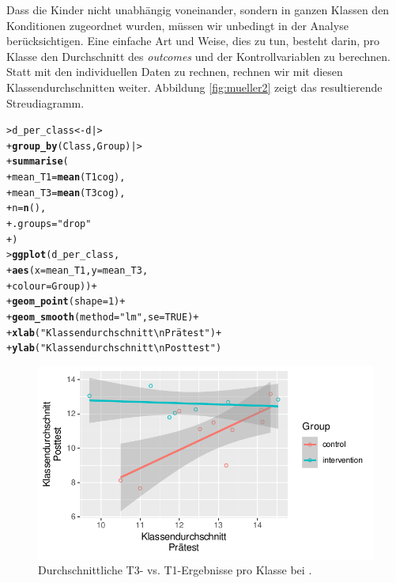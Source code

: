 \documentclass[oneside, 10pt]{book}\usepackage[]{graphicx}\usepackage[]{xcolor}
\makeatletter
\newcommand{\hlnum}[1]{\textcolor[rgb]{0.686,0.059,0.569}{#1}}%
\newcommand{\hlstr}[1]{\textcolor[rgb]{0.192,0.494,0.8}{#1}}%
\newcommand{\hlopt}[1]{\textcolor[rgb]{0,0,0}{#1}}%
\newcommand{\hlstd}[1]{\textcolor[rgb]{0.345,0.345,0.345}{#1}}%
\newcommand{\hlkwb}[1]{\textcolor[rgb]{0.69,0.353,0.396}{#1}}%
\newcommand{\hlkwc}[1]{\textcolor[rgb]{0.333,0.667,0.333}{#1}}%
\newcommand{\hlkwd}[1]{\textcolor[rgb]{0.737,0.353,0.396}{\textbf{#1}}}%
\newenvironment{kframe}{%
 \def\at@end@of@kframe{}%
 \ifinner\ifhmode%
  \def\at@end@of@kframe{\end{minipage}}%
  \begin{minipage}{\columnwidth}%
 \fi\fi%
 \def\FrameCommand##1{\hskip\@totalleftmargin \hskip-\fboxsep
 \colorbox{shadecolor}{##1}\hskip-\fboxsep
     \hskip-\linewidth \hskip-\@totalleftmargin \hskip\columnwidth}%
 \MakeFramed {\advance\hsize-\width
   \@totalleftmargin\z@ \linewidth\hsize
   \@setminipage}}%
 {\par\unskip\endMakeFramed%
 \at@end@of@kframe}
\newenvironment{knitrout}{}{} %
\makeatother
\begin{document}
Dass die Kinder nicht unabhängig voneinander, sondern in ganzen Klassen
den Konditionen zugeordnet wurden, müssen wir unbedingt in der Analyse
berücksichtigen. Eine einfache Art und Weise, dies zu tun, besteht darin,
pro Klasse den Durchschnitt des \textit{outcomes} und der Kontrollvariablen
zu berechnen. Statt mit den individuellen Daten zu rechnen, rechnen wir
mit diesen Klassendurchschnitten weiter. Abbildung \ref{fig:mueller2}
zeigt das resultierende Streudiagramm.
\begin{knitrout}
\color{fgcolor}\begin{kframe}
\begin{alltt}
\hlstd{> }\hlstd{d_per_class} \hlkwb{<-} \hlstd{d |>}
\hlstd{+ }  \hlkwd{group_by}\hlstd{(Class, Group) |>}
\hlstd{+ }  \hlkwd{summarise}\hlstd{(}
\hlstd{+ }    \hlkwc{mean_T1} \hlstd{=} \hlkwd{mean}\hlstd{(T1cog),}
\hlstd{+ }    \hlkwc{mean_T3} \hlstd{=} \hlkwd{mean}\hlstd{(T3cog),}
\hlstd{+ }    \hlkwc{n} \hlstd{=} \hlkwd{n}\hlstd{(),}
\hlstd{+ }    \hlkwc{.groups} \hlstd{=} \hlstr{"drop"}
\hlstd{+ }  \hlstd{)}
\hlstd{> }\hlkwd{ggplot}\hlstd{(d_per_class,}
\hlstd{+ }       \hlkwd{aes}\hlstd{(}\hlkwc{x} \hlstd{= mean_T1,} \hlkwc{y} \hlstd{= mean_T3,}
\hlstd{+ }           \hlkwc{colour} \hlstd{= Group))} \hlopt{+}
\hlstd{+ }  \hlkwd{geom_point}\hlstd{(}\hlkwc{shape} \hlstd{=} \hlnum{1}\hlstd{)} \hlopt{+}
\hlstd{+ }  \hlkwd{geom_smooth}\hlstd{(}\hlkwc{method} \hlstd{=} \hlstr{"lm"}\hlstd{,} \hlkwc{se} \hlstd{=} \hlnum{TRUE}\hlstd{)} \hlopt{+}
\hlstd{+ }  \hlkwd{xlab}\hlstd{(}\hlstr{"Klassendurchschnitt\textbackslash{}nPrätest"}\hlstd{)} \hlopt{+}
\hlstd{+ }  \hlkwd{ylab}\hlstd{(}\hlstr{"Klassendurchschnitt\textbackslash{}nPosttest"}\hlstd{)}
\end{alltt}
\end{kframe}\begin{figure}[tp]

{\centering \includegraphics[width=.7\textwidth]{figs/unnamed-chunk-328-1} 

}

\caption{Durchschnittliche T3- vs. T1-Ergebnisse pro Klasse bei \citet{Hicks2021}.\label{fig:mueller2}}\label{fig:unnamed-chunk-328}
\end{figure}

\end{knitrout}
\end{document}
